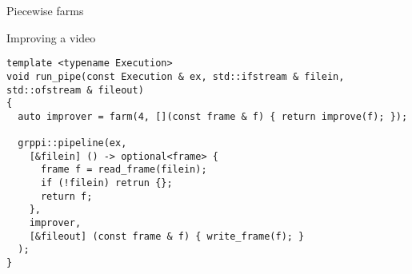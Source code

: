 \begin{frame}[t,fragile]{Piecewise farms}
\begin{block}{Improving a video}
\begin{lstlisting}
template <typename Execution>
void run_pipe(const Execution & ex, std::ifstream & filein, std::ofstream & fileout)
{
  auto improver = farm(4, [](const frame & f) { return improve(f); });

  grppi::pipeline(ex,
    [&filein] () -> optional<frame> {
      frame f = read_frame(filein);
      if (!filein) retrun {};
      return f;
    },
    improver,
    [&fileout] (const frame & f) { write_frame(f); }
  );
}
\end{lstlisting}
\end{block}
\end{frame}
